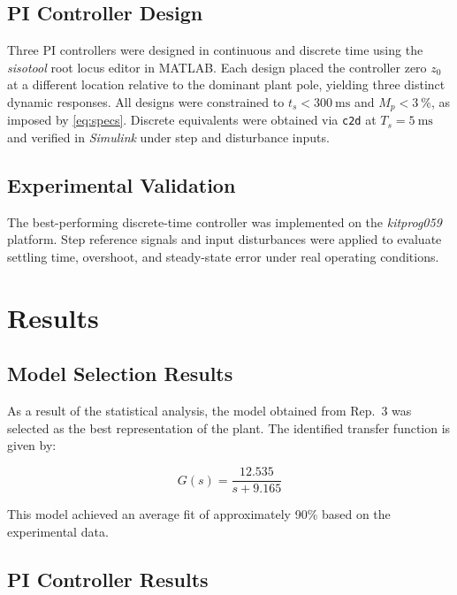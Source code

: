 \documentclass[conference]{IEEEtran}
\begin{document}
\subsection{PI Controller Design}

Three PI controllers were designed in continuous and discrete time using the
\textit{sisotool} root locus editor in MATLAB. Each design placed the controller zero
$z_0$ at a different location relative to the dominant plant pole, yielding three
distinct dynamic responses. All designs were constrained to $t_s < \SI{300}{\milli\second}$
and $M_p < \SI{3}{\percent}$, as imposed by \eqref{eq:specs}. Discrete equivalents
were obtained via \texttt{c2d} at $T_s = \SI{5}{\milli\second}$ and verified in
\textit{Simulink} under step and disturbance inputs.

\subsection{Experimental Validation}

The best-performing discrete-time controller was implemented on the
\textit{kitprog059} platform. Step reference signals and input disturbances were
applied to evaluate settling time, overshoot, and steady-state error under real
operating conditions.


\section{Results}

\subsection{Model Selection Results}

As a result of the statistical analysis, the model obtained from Rep.~3 was selected as the best representation of the plant. The identified transfer function is given by:

\begin{equation}
		G(s) = \frac{12.535}{s + 9.165}
    \label{eq:plant_model}
\end{equation}



This model achieved an average fit of approximately 90\% based on the experimental data.

\subsection{PI Controller Results}
\end{document}
